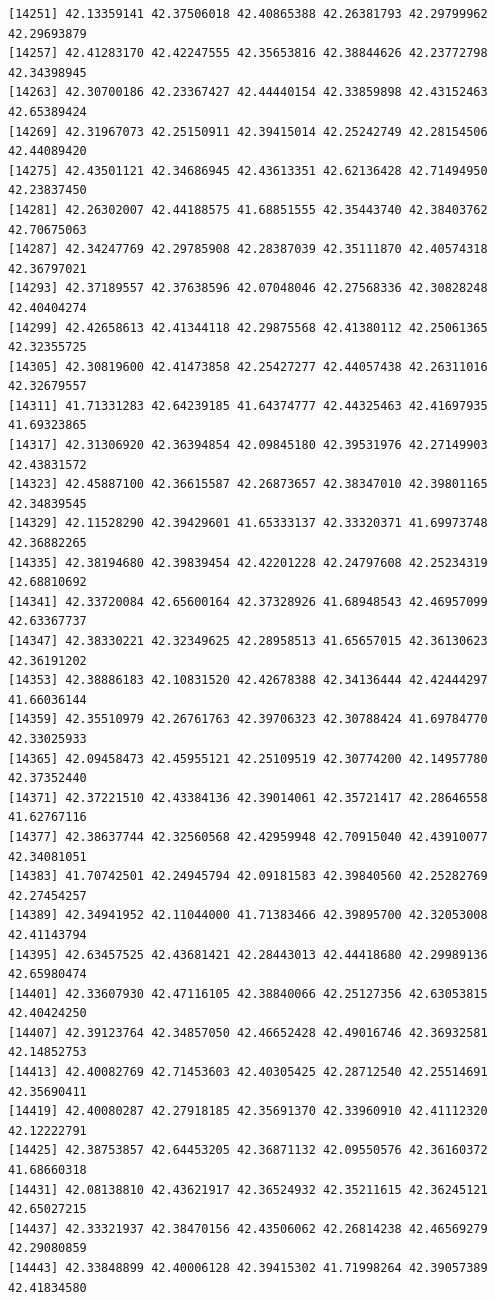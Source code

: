 \documentclass[
  letterpaper,
  DIV=11,
  numbers=noendperiod]{scrartcl}
\begin{document}
\begin{verbatim}
[14251] 42.13359141 42.37506018 42.40865388 42.26381793 42.29799962 42.29693879
[14257] 42.41283170 42.42247555 42.35653816 42.38844626 42.23772798 42.34398945
[14263] 42.30700186 42.23367427 42.44440154 42.33859898 42.43152463 42.65389424
[14269] 42.31967073 42.25150911 42.39415014 42.25242749 42.28154506 42.44089420
[14275] 42.43501121 42.34686945 42.43613351 42.62136428 42.71494950 42.23837450
[14281] 42.26302007 42.44188575 41.68851555 42.35443740 42.38403762 42.70675063
[14287] 42.34247769 42.29785908 42.28387039 42.35111870 42.40574318 42.36797021
[14293] 42.37189557 42.37638596 42.07048046 42.27568336 42.30828248 42.40404274
[14299] 42.42658613 42.41344118 42.29875568 42.41380112 42.25061365 42.32355725
[14305] 42.30819600 42.41473858 42.25427277 42.44057438 42.26311016 42.32679557
[14311] 41.71331283 42.64239185 41.64374777 42.44325463 42.41697935 41.69323865
[14317] 42.31306920 42.36394854 42.09845180 42.39531976 42.27149903 42.43831572
[14323] 42.45887100 42.36615587 42.26873657 42.38347010 42.39801165 42.34839545
[14329] 42.11528290 42.39429601 41.65333137 42.33320371 41.69973748 42.36882265
[14335] 42.38194680 42.39839454 42.42201228 42.24797608 42.25234319 42.68810692
[14341] 42.33720084 42.65600164 42.37328926 41.68948543 42.46957099 42.63367737
[14347] 42.38330221 42.32349625 42.28958513 41.65657015 42.36130623 42.36191202
[14353] 42.38886183 42.10831520 42.42678388 42.34136444 42.42444297 41.66036144
[14359] 42.35510979 42.26761763 42.39706323 42.30788424 41.69784770 42.33025933
[14365] 42.09458473 42.45955121 42.25109519 42.30774200 42.14957780 42.37352440
[14371] 42.37221510 42.43384136 42.39014061 42.35721417 42.28646558 41.62767116
[14377] 42.38637744 42.32560568 42.42959948 42.70915040 42.43910077 42.34081051
[14383] 41.70742501 42.24945794 42.09181583 42.39840560 42.25282769 42.27454257
[14389] 42.34941952 42.11044000 41.71383466 42.39895700 42.32053008 42.41143794
[14395] 42.63457525 42.43681421 42.28443013 42.44418680 42.29989136 42.65980474
[14401] 42.33607930 42.47116105 42.38840066 42.25127356 42.63053815 42.40424250
[14407] 42.39123764 42.34857050 42.46652428 42.49016746 42.36932581 42.14852753
[14413] 42.40082769 42.71453603 42.40305425 42.28712540 42.25514691 42.35690411
[14419] 42.40080287 42.27918185 42.35691370 42.33960910 42.41112320 42.12222791
[14425] 42.38753857 42.64453205 42.36871132 42.09550576 42.36160372 41.68660318
[14431] 42.08138810 42.43621917 42.36524932 42.35211615 42.36245121 42.65027215
[14437] 42.33321937 42.38470156 42.43506062 42.26814238 42.46569279 42.29080859
[14443] 42.33848899 42.40006128 42.39415302 41.71998264 42.39057389 42.41834580

\end{verbatim}
\end{document}
